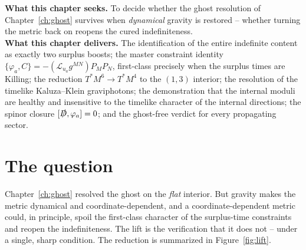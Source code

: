 \documentclass[11pt,oneside]{book}
\newcommand{\Lie}{\mathcal{L}}
\newcommand{\Dirac}{\slashed{D}}
\theoremstyle{plain}
\theoremstyle{definition}
\theoremstyle{remark}
\begin{document}
\begin{leavesbox}
\textbf{What this chapter seeks.} To decide whether the ghost resolution of
Chapter~\ref{ch:ghost} survives when \emph{dynamical} gravity is restored -- whether
turning the metric back on reopens the cured indefiniteness.\\[2pt]
\textbf{What this chapter delivers.} The identification of the entire indefinite
content as exactly two surplus boosts; the master constraint identity
$\{\varphi_a,C\}=-(\Lie_{u_a}g^{MN})P_MP_N$, first-class precisely when the surplus
times are Killing; the reduction $T^*M^6\to T^*M^4$ to the $(1,3)$ interior; the
resolution of the timelike Kaluza--Klein graviphotons; the demonstration that the
internal moduli are healthy and insensitive to the timelike character of the
internal directions; the spinor closure $[\Dirac,\varphi_a]=0$; and the ghost-free
verdict for every propagating sector.
\end{leavesbox}

\section{The question}
\label{sec:lift-question}

Chapter~\ref{ch:ghost} resolved the ghost on the \emph{flat} interior. But gravity
makes the metric dynamical and coordinate-dependent, and a coordinate-dependent
metric could, in principle, spoil the first-class character of the surplus-time
constraints and reopen the indefiniteness. The lift is the verification that it does
not -- under a single, sharp condition. The reduction is summarized in
Figure~\ref{fig:lift}.
\end{document}
